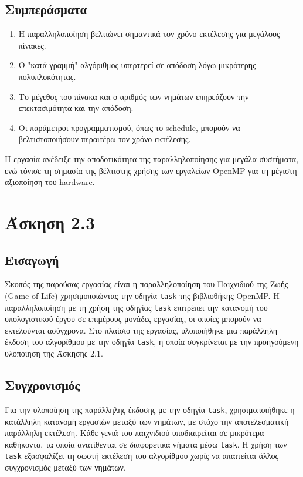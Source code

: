 \documentclass{article}
\begin{document}
\subsection*{Συμπεράσματα} 
\begin{enumerate} 
    \item Η παραλληλοποίηση βελτιώνει σημαντικά τον χρόνο εκτέλεσης για μεγάλους πίνακες. 
    \item Ο "κατά γραμμή" αλγόριθμος υπερτερεί σε απόδοση λόγω μικρότερης πολυπλοκότητας. 
    \item Το μέγεθος του πίνακα και ο αριθμός των νημάτων επηρεάζουν την επεκτασιμότητα και την απόδοση. 
    \item Οι παράμετροι προγραμματισμού, όπως το schedule, μπορούν να βελτιστοποιήσουν περαιτέρω τον χρόνο εκτέλεσης. 
\end{enumerate} 
Η εργασία ανέδειξε την αποδοτικότητα της παραλληλοποίησης για μεγάλα συστήματα, ενώ τόνισε τη σημασία της βέλτιστης χρήσης των εργαλείων OpenMP για τη μέγιστη αξιοποίηση του hardware.
\section*{Άσκηση 2.3} 
\subsection*{Εισαγωγή} Σκοπός της παρούσας εργασίας είναι η παραλληλοποίηση του Παιχνιδιού της Ζωής (Game of Life) χρησιμοποιώντας την οδηγία \texttt{task} της βιβλιοθήκης OpenMP. Η παραλληλοποίηση με τη χρήση της οδηγίας \texttt{task} επιτρέπει την κατανομή του υπολογιστικού έργου σε επιμέρους μονάδες εργασίας, οι οποίες μπορούν να εκτελούνται ασύγχρονα. Στο πλαίσιο της εργασίας, υλοποιήθηκε μια παράλληλη έκδοση του αλγορίθμου με την οδηγία \texttt{task}, η οποία συγκρίνεται με την προηγούμενη υλοποίηση της Άσκησης 2.1.
\subsection*{Συγχρονισμός} Για την υλοποίηση της παράλληλης έκδοσης με την οδηγία \texttt{task}, χρησιμοποιήθηκε η κατάλληλη κατανομή εργασιών μεταξύ των νημάτων, με στόχο την αποτελεσματική παράλληλη εκτέλεση. Κάθε γενιά του παιχνιδιού υποδιαιρείται σε μικρότερα καθήκοντα, τα οποία ανατίθενται σε διαφορετικά νήματα μέσω \texttt{task}. Η χρήση των \texttt{task} εξασφαλίζει τη σωστή εκτέλεση του αλγορίθμου χωρίς να απαιτείται άλλος συγχρονισμός μεταξύ των νημάτων.
\end{document}
